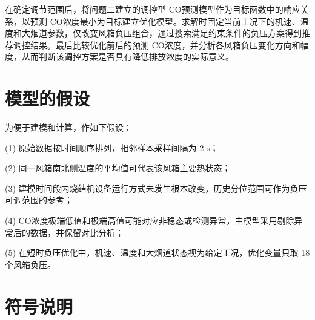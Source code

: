 \documentclass[UTF8,a4paper,zihao=-4]{ctexart}
\newcommand{\CO}{CO}
\begin{document}
在确定调节范围后，将问题二建立的调控型 \CO 预测模型作为目标函数中的响应关系，以预测 \CO 浓度最小为目标建立优化模型。求解时固定当前工况下的机速、温度和大烟道参数，仅改变风箱负压组合，通过搜索满足约束条件的负压方案得到推荐调控结果。最后比较优化前后的预测 \CO 浓度，并分析各风箱负压变化方向和幅度，从而判断该调控方案是否具有降低排放浓度的实际意义。

\section{模型的假设}

为便于建模和计算，作如下假设：

(1) 原始数据按时间顺序排列，相邻样本采样间隔为 2 s；

(2) 同一风箱南北侧温度的平均值可代表该风箱主要热状态；

(3) 建模时间段内烧结机设备运行方式未发生根本改变，历史分位范围可作为负压可调范围的参考；

(4) \CO 浓度极端低值和极端高值可能对应非稳态或检测异常，主模型采用剔除异常后的数据，并保留对比分析；

(5) 在短时负压优化中，机速、温度和大烟道状态视为给定工况，优化变量只取 18 个风箱负压。

\section{符号说明}
\end{document}

